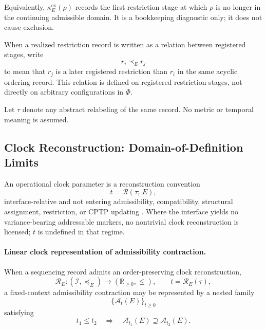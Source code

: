 \documentclass[aps,prx,onecolumn,11pt]{revtex4-2}
\theoremstyle{plain}
\theoremstyle{definition}
\theoremstyle{remark}
\begin{document}
Equivalently, \(\kappa_E^{\mathrm{ex}}(\rho)\) records the first
restriction stage at which \(\rho\) is no longer in the continuing
admissible domain. It is a bookkeeping diagnostic only; it does not
cause exclusion.

When a realized restriction record is written as a relation between
registered stages, write
\[
r_i\prec_E r_j
\]
to mean that \(r_j\) is a later registered restriction than \(r_i\) in
the same acyclic ordering record. This relation is defined on registered
restriction stages, not directly on arbitrary configurations in
\(\Phi\).

Let \(\tau\) denote any abstract relabeling of the same record. No
metric or temporal meaning is assumed.

\subsection{Clock Reconstruction: Domain-of-Definition Limits}
\label{subsec:cd_clock_domain_limits}

An operational clock parameter is a reconstruction convention
\begin{equation}
t=\mathcal{R}(\tau;\,E),
\label{eq:cd_clock_reconstruction_map}
\end{equation}
interface-relative and not entering admissibility, compatibility,
structural assignment, restriction, or CPTP updating
\cite{PageWootters1983,Rovelli1991,GambiniPullin2007}. Where the
interface yields no variance-bearing addressable markers, no nontrivial
clock reconstruction is licensed; \(t\) is undefined in that regime.

\paragraph{Linear clock representation of admissibility contraction.}

When a sequencing record admits an order-preserving clock
reconstruction,
\begin{equation}
\mathcal{R}_E:
(\mathcal{I},\preceq_E)
\to
(\mathbb{R}_{\geq 0},\leq),
\qquad
t=\mathcal{R}_E(\tau),
\label{eq:linear_clock_reconstruction_order_preserving}
\end{equation}
a fixed-context admissibility contraction may be represented by a
nested family
\[
\{\mathcal{A}_t(E)\}_{t\geq 0}
\]
satisfying
\begin{equation}
t_1\leq t_2
\quad\Longrightarrow\quad
\mathcal{A}_{t_1}(E)
\supseteq
\mathcal{A}_{t_2}(E).
\label{eq:linear_clock_nested_admissibility}
\end{equation}
\end{document}
